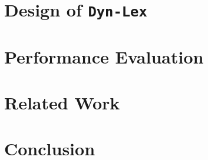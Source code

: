 \documentclass[12pt]{article}
\newcommand{\lex} {\texttt{Dyn-Lex}\xspace}
\begin{document}
\section{Design of \lex}
\label{sec.design}

\section{Performance Evaluation}
\label{sec.eval}

\section{Related Work}
\label{sec.related}

\section{Conclusion}
\label{sec.conclusion}
\end{document}

